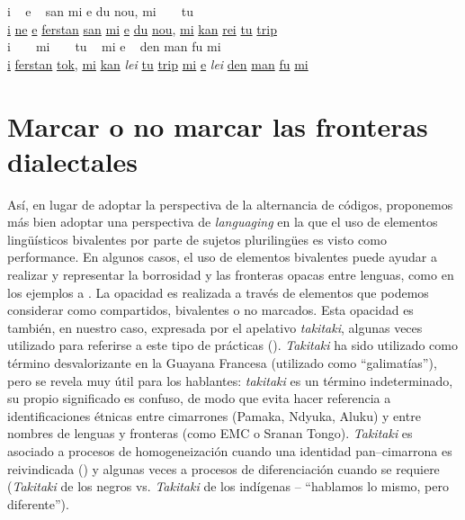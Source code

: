 \documentclass[output=paper]{langscibook}
\begin{document}
\let\eachwordone=\itshape
\ea\label{ex:leglise:7}
\ea
\gll i           ~            e           ~ 	           san                  mi            e            du            nou,            mi   ~                    ~                tu     ~ \\
    \uline{i}  \uline{ne}  \uline{e}  \uline{ferstan}  \uline{san}  \uline{mi}   \uline{e}   \uline{du}  \uline{nou},   \uline{mi}  \uline{kan}  \uline{rei}    \uline{tu}   \uline{trip}\\
\ex
\gll i   ~ ~ mi   ~ ~    tu  ~  mi e    ~   den  man   fu mi\\
\uline{i}   \uline{ferstan} \uline{tok}, \uline{mi} \uline{kan}   \textit{lei}       \uline{tu} \uline{trip}  \uline{mi} \uline{e}      \textit{lei}      \uline{den} \uline{man} \uline{fu} \uline{mi}\\
\z
\z
\let\eachwordone=\upshape

 \section{Marcar o no marcar las fronteras dialectales}


Así, en lugar de adoptar la perspectiva de la alternancia de códigos, proponemos más bien adoptar una perspectiva de \textit{languaging} en la que el uso de elementos lingüísticos bivalentes por parte de sujetos plurilingües es visto como performance. En algunos casos, el uso de elementos bivalentes puede ayudar a realizar y representar la borrosidad y las fronteras opacas entre lenguas, como en los ejemplos  a . La opacidad es realizada a través de elementos que podemos considerar como compartidos, bivalentes o no marcados. Esta opacidad es también, en nuestro caso, expresada por el apelativo \textit {takitaki}, algunas veces utilizado para referirse a este tipo de prácticas (\citealt{LégliseMigge2006}). \textit {Takitaki} ha sido utilizado como término desvalorizante en la Guayana Francesa (utilizado como “galimatías”), pero se revela muy útil para los hablantes: \textit {takitaki} es un término indeterminado, su propio significado es confuso, de modo que evita hacer referencia a identificaciones étnicas entre cimarrones (Pamaka, Ndyuka, Aluku) y entre nombres de lenguas y fronteras (como EMC o Sranan Tongo). \textit {Takitaki} es asociado a procesos de homogeneización cuando una identidad pan--cimarrona es reivindicada (\citealt{MiggeLéglise2013}) y algunas veces a procesos de diferenciación cuando se requiere (\textit {Takitaki} de los negros vs. \textit {Takitaki} de los indígenas -- “hablamos lo mismo, pero diferente”).
\end{document}
